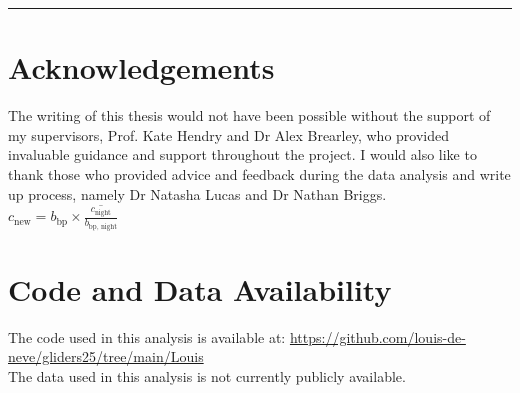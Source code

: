 \documentclass[
	a4paper, %
	10pt, %
	unnumberedsections, %
	twoside, %
]{LTJournalArticle}
\begin{document}
\begin{center}
	\rule{\linewidth}{0.4pt}
\end{center}
\section*{Acknowledgements}
	
The writing of this thesis would not have been possible without the support of my supervisors, Prof. Kate Hendry and 
Dr Alex Brearley, who provided invaluable guidance and support throughout the project.
I would also like to thank those who provided advice and feedback during the data analysis and write up process, namely
Dr Natasha Lucas and Dr Nathan Briggs.\\

$c_{\text{new}} = b_{\text{bp}} \times \overline{\frac{c_{\text{night}}}{b_{\text{bp, night}}}}$

\section*{Code and Data Availability}
The code used in this analysis is available at: \url{https://github.com/louis-de-neve/gliders25/tree/main/Louis}\\
The data used in this analysis is not currently publicly available.\\



\clearpage

\twocolumn

	
\printbibliography %
	

\end{document}

